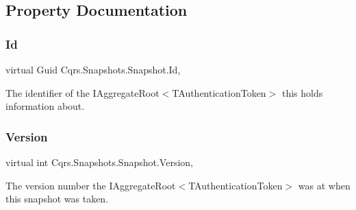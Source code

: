 \subsection{Property Documentation}
\mbox{\label{classCqrs_1_1Snapshots_1_1Snapshot_a0da54bdfa43e46a17f6e6aa88d1f3b67_a0da54bdfa43e46a17f6e6aa88d1f3b67}} 
\subsubsection{\texorpdfstring{Id}{Id}}
{\footnotesize\ttfamily virtual Guid Cqrs.\+Snapshots.\+Snapshot.\+Id\hspace{0.3cm}{\ttfamily [get]}, {\ttfamily [set]}}



The identifier of the I\+Aggregate\+Root$<$\+T\+Authentication\+Token$>$ this holds information about. 

\mbox{\label{classCqrs_1_1Snapshots_1_1Snapshot_a59c0a399430e5f4a1b27d999c3bb5d4f_a59c0a399430e5f4a1b27d999c3bb5d4f}} 
\subsubsection{\texorpdfstring{Version}{Version}}
{\footnotesize\ttfamily virtual int Cqrs.\+Snapshots.\+Snapshot.\+Version\hspace{0.3cm}{\ttfamily [get]}, {\ttfamily [set]}}



The version number the I\+Aggregate\+Root$<$\+T\+Authentication\+Token$>$ was at when this snapshot was taken. 

